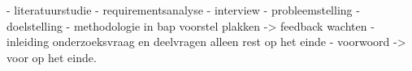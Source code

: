 
\chapter*{}%
\label{ch:voorwoord}



- literatuurstudie
- requirementsanalyse
- interview
- probleemstelling
- doelstelling
- methodologie in bap voorstel plakken -> feedback wachten
- inleiding onderzoeksvraag en deelvragen alleen rest op het einde
- voorwoord -> voor op het einde.
